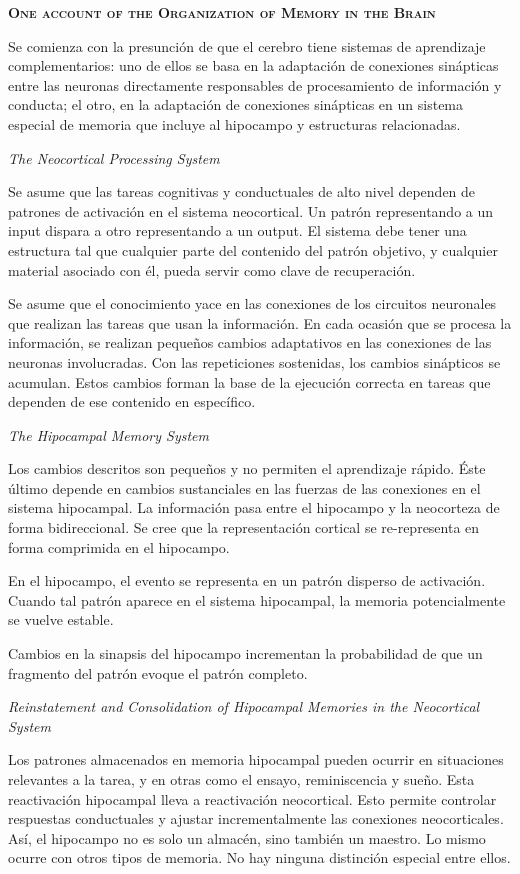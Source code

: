 \documentclass[a4paper,12pt]{article}
\begin{document}
{\scshape\bfseries One account of the Organization of Memory in the Brain}

Se comienza con la presunción de que el cerebro tiene sistemas de aprendizaje complementarios: uno de ellos se basa en la adaptación de conexiones sinápticas entre las neuronas directamente responsables de procesamiento de información y conducta; el otro, en la adaptación de conexiones sinápticas en un sistema especial de memoria que incluye al hipocampo y estructuras relacionadas.

{\itshape The Neocortical Processing System}

Se asume que las tareas cognitivas y conductuales de alto nivel dependen de patrones de activación en el sistema neocortical. Un patrón representando a un input dispara a otro representando a un output. El sistema debe tener una estructura tal que cualquier parte del contenido del patrón objetivo, y cualquier material asociado con él, pueda servir como clave de recuperación.

Se asume que el conocimiento yace en las conexiones de los circuitos neuronales que realizan las tareas que usan la información. En cada ocasión que se procesa la información, se realizan pequeños cambios adaptativos en las conexiones de las neuronas involucradas. Con las repeticiones sostenidas, los cambios sinápticos se acumulan. Estos cambios forman la base de la ejecución correcta en tareas que dependen de ese contenido en específico.

{\itshape The Hipocampal Memory System}

Los cambios descritos son pequeños y no permiten el aprendizaje rápido. Éste último depende en cambios sustanciales en las fuerzas de las conexiones en el sistema hipocampal. La información pasa entre el hipocampo y la neocorteza de forma bidireccional. Se cree que la representación cortical se re-representa en forma comprimida en el hipocampo. 

En el hipocampo, el evento se representa en un patrón disperso de activación. Cuando tal patrón aparece en el sistema hipocampal, la memoria potencialmente se vuelve estable.

Cambios en la sinapsis del hipocampo incrementan la probabilidad de que un fragmento del patrón evoque el patrón completo. 

{\itshape Reinstatement and Consolidation of Hipocampal Memories in the Neocortical System}

Los patrones almacenados en memoria hipocampal pueden ocurrir en situaciones relevantes a la tarea, y en otras como el ensayo, reminiscencia y sueño. Esta reactivación hipocampal lleva a reactivación neocortical. Esto permite controlar respuestas conductuales y ajustar incrementalmente las conexiones neocorticales. Así, el hipocampo no es solo un almacén, sino también un maestro. Lo mismo ocurre con otros tipos de memoria. No hay ninguna distinción especial entre ellos.
\end{document}
